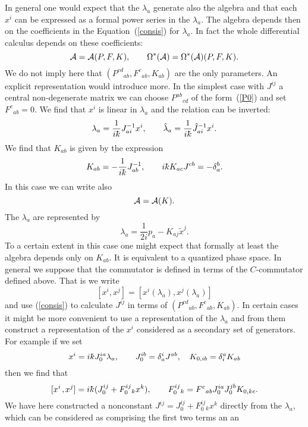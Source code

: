 \documentclass[a4paper,12pt]{article}
\def\h#1{\hat #1}
\def\t#1{\tilde #1}
\def\c#1{{\cal #1}}
\def\kbar{{\mathchar'26\mkern-9muk}}
\def\t#1{\tilde #1}
\def\k{\kern-.1em\mathbin{,}\kern-.1em}
\begin{document}
In general one would expect that the $\lambda_a$ generate also the
algebra and that each $x^i$ can be expressed as a formal power series
in the $\lambda_a$. The algebra depends then on the coefficients in
the Equation~(\ref{consis}) for $\lambda_a$. In fact the whole
differential calculus depends on these coefficients:
\begin{equation}
\c{A} = \c{A}(P,F,K), \qquad
\Omega^*(\c{A}) = \Omega^*(\c{A})(P,F,K).                    \label{P-F-K}
\end{equation}
We do not imply here that $(P^{cd}{}_{ab},F^c{}_{ab},K_{ab})$ 
are the only parameters. An explicit representation would introduce more.
In the simplest case with $J^{ij}$ a central non-degenerate matrix we
can choose $P^{ab}{}_{cd}$ of the form~(\ref{P0}) and set 
$F^c{}_{ab} = 0$. We find that $x^i$ is linear in $\lambda_a$ and the
relation can be inverted:
\begin{equation}
\lambda_a = \frac 1{i\kbar} J^{-1}_{ai} x^i, \qquad
\h{\lambda}_a = \frac 1{i\kbar} \h{J}^{-1}_{ai} x^i.           \label{l-x}
\end{equation}
We find that $K_{ab}$ is given by the expression
\begin{equation}
K_{ab} = - \frac 1{i\kbar} J^{-1}_{ab},\qquad
i \kbar K_{ac} J^{cb} = - \delta_a^b.                          \label{K-J}
\end{equation}
In this case we can write also
$$
\c{A} = \c{A}(K).
$$
The $\lambda_a$ are represented by
$$
\lambda_a = \frac1{2i} p_a - K_{aj} \t{x}^j.
$$
To a certain extent in this case one might expect that formally at
least the algebra depends only on $K_{ab}$. It is equivalent to a quantized
phase space.  In general we suppose that the commutator is defined in
terms of the $C$-commuta\-tor defined above. That is we write
$$
[x^i,x^j] = [x^i(\lambda_a), x^j(\lambda_a)]
$$
and use (\ref{consis}) to calculate $J^{ij}$ in terms of
$(P^{cd}{}_{ab},F^c{}_{ab},K_{ab})$. In certain cases it might be more
convenient to use a representation of the $\lambda_a$ and from them
construct a representation of the $x^i$ considered as a secondary set
of generators. For example if we set
$$
x^i = i \kbar J_0^{ia} \lambda_a, \qquad J_0^{ib} = \delta^i_a J^{ab},
\quad K_{0,ib} = \delta^a_i K_{ab}
$$
then we find that
$$
[x^i\k x^j] = i \kbar (J_0^{ij} + F_0^{ij}{}_k x^k), \qquad
F_0^{ij}{}_k = F^c{}_{ab} J_0^{ia} J_0^{jb} K_{0,kc}. 
$$
We have here constructed a nonconstant 
$J^{ij} = J_0^{ij} +F_0^{ij}{}_k x^k$ directly from the $\lambda_a$,
which can be considered as comprising the first two terms an an
\end{document}
